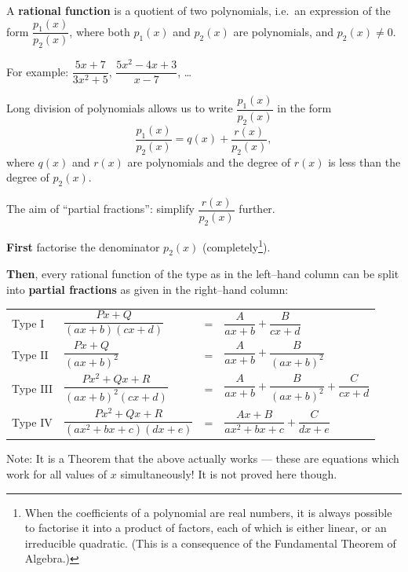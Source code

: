\documentclass[
  english,
  12pt,
  oneside]{book}
\newcounter{none} %
\theoremstyle{definition}
\theoremstyle{definition}
\theoremstyle{definition}
\theoremstyle{definition}
\theoremstyle{remark}
\begin{document}
A \textbf{rational function} is a quotient of two polynomials, i.e.~an expression of the form \(\dfrac{p_1(x)}{p_2(x)}\), where both \(p_1(x)\) and \(p_2(x)\) are polynomials, and \(p_2(x)\neq0\).

For example: \(\dfrac{5x+7}{3x^2+5}\), \(\dfrac{5x^2-4x+3}{x-7}\), \ldots{}

Long division of polynomials allows us to write \(\dfrac{p_1(x)}{p_2(x)}\) in the form
\[\frac{p_1(x)}{p_2(x)} = q(x) + \frac{r(x)}{p_2(x)},\]
where \(q(x)\) and \(r(x)\) are polynomials and the degree of \(r(x)\) is less than
the degree of \(p_2(x)\).

The aim of ``partial fractions'': simplify \(\dfrac{r(x)}{p_2(x)}\) further.

\textbf{First} factorise the denominator \(p_2(x)\) (completely\footnote{When the coefficients of a polynomial are real numbers, it is always possible to factorise it into a product of factors, each of which is either linear, or an irreducible quadratic. (This is a consequence of the Fundamental Theorem of Algebra.)}).

\textbf{Then}, every rational function of the type as in the left--hand column can be split
into \textbf{partial fractions} as given in the right--hand column:

{\def\LTcaptype{none} %
\begin{longtable}[]{@{}
  >{\raggedright\arraybackslash}p{}
  >{\raggedleft\arraybackslash}p{}
  >{\raggedright\arraybackslash}p{}
  >{\raggedright\arraybackslash}p{}@{}}
\toprule\noalign{}
\endhead
\bottomrule\noalign{}
\endlastfoot
Type I & \(\dfrac{Px+Q}{(ax+b)(cx+d)}\) & = & \(\dfrac{A}{ax+b}+\dfrac{B}{cx+d}\) \\
Type II & \(\dfrac{Px+Q}{(ax+b)^2}\) & = & \(\dfrac{A}{ax+b}+\dfrac{B}{(ax+b)^2}\) \\
Type III & \(\dfrac{Px^2+Qx+R}{(ax+b)^2(cx+d)}\) & = & \(\dfrac{A}{ax+b}+\dfrac{B}{(ax+b)^2}+\dfrac{C}{cx+d}\) \\
Type IV & \(\dfrac{Px^2+Qx+R}{(ax^2+bx+c)(dx+e)}\) & = & \(\dfrac{Ax+B}{ax^2+bx+c}+\dfrac{C}{dx+e}\) \\
\end{longtable}
}

Note: It is a Theorem that the above actually works --- these are equations which work for all values of \(x\) simultaneously! It is not proved here though.
\end{document}
